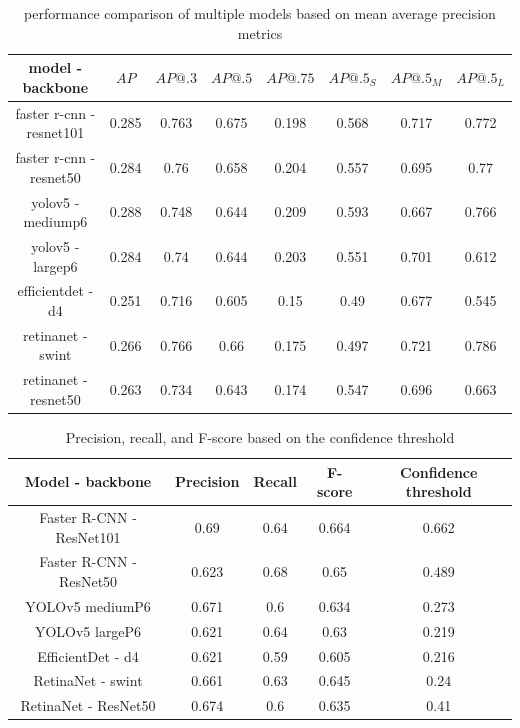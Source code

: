 \begin{table}
    \begin{tabular}{c||c|c|c|c|c|c|c}
        model - backbone         & $AP$  & $AP@.3$ & $AP@.5$ & $AP@.75$ & $AP@.5_S$ & $AP@.5_M$ & $AP@.5_L$ \\ \hline \hline
        faster r-cnn - resnet101 & 0.285 & 0.763   & 0.675   & 0.198    & 0.568     & 0.717     & 0.772     \\ \hline
        faster r-cnn - resnet50  & 0.284 & 0.76    & 0.658   & 0.204    & 0.557     & 0.695     & 0.77      \\ \hline
        yolov5 - mediump6        & 0.288 & 0.748   & 0.644   & 0.209    & 0.593     & 0.667     & 0.766     \\ \hline
        yolov5 - largep6         & 0.284 & 0.74    & 0.644   & 0.203    & 0.551     & 0.701     & 0.612     \\ \hline
        efficientdet - d4        & 0.251 & 0.716   & 0.605   & 0.15     & 0.49      & 0.677     & 0.545     \\ \hline
        retinanet - swint        & 0.266 & 0.766   & 0.66    & 0.175    & 0.497     & 0.721     & 0.786     \\ \hline
        retinanet - resnet50     & 0.263 & 0.734   & 0.643   & 0.174    & 0.547     & 0.696     & 0.663     \\
    \end{tabular}
    \caption{performance comparison of multiple models based on mean average precision metrics}
    \label{tab:model_results:stage_four}
\end{table}

\begin{table}
    \begin{tabular}{c||c|c|c|c}
        Model - backbone         & Precision & Recall & F-score & Confidence threshold \\ \hline \hline
        Faster R-CNN - ResNet101 & 0.69      & 0.64   & 0.664   & 0.662                \\ \hline
        Faster R-CNN - ResNet50  & 0.623     & 0.68   & 0.65    & 0.489                \\ \hline
        YOLOv5 mediumP6          & 0.671     & 0.6    & 0.634   & 0.273                \\ \hline
        YOLOv5 largeP6           & 0.621     & 0.64   & 0.63    & 0.219                \\ \hline
        EfficientDet - d4        & 0.621     & 0.59   & 0.605   & 0.216                \\ \hline
        RetinaNet - swint        & 0.661     & 0.63   & 0.645   & 0.24                 \\ \hline
        RetinaNet - ResNet50     & 0.674     & 0.6    & 0.635   & 0.41                 \\
    \end{tabular}
    \caption{Precision, recall, and F-score based on the confidence threshold}
    \label{tab:model_prf:stage_four}
\end{table}

